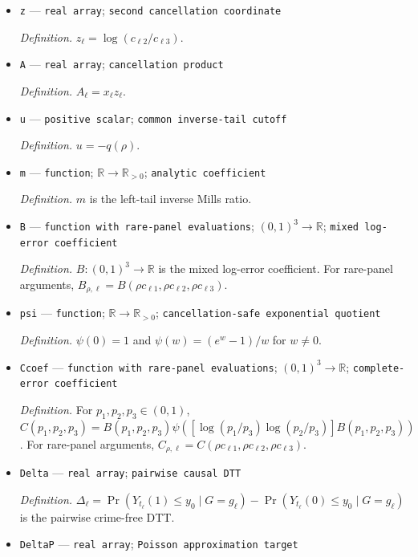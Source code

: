 \documentclass{article}
\begin{document}
\begin{itemize}
  \item \texttt{z} --- \texttt{real array}; \texttt{second cancellation coordinate}
  \par\smallskip\noindent\emph{Definition.} \(z_{\ell}=\log(c_{\ell2}/c_{\ell3})\).
  \item \texttt{A} --- \texttt{real array}; \texttt{cancellation product}
  \par\smallskip\noindent\emph{Definition.} \(A_{\ell}=x_{\ell}z_{\ell}\).
  \item \texttt{u} --- \texttt{positive scalar}; \texttt{common inverse-\allowbreak{}tail cutoff}
  \par\smallskip\noindent\emph{Definition.} \(u=-q(\rho)\).
  \item \texttt{m} --- \texttt{function}; \(\mathbb R\to\mathbb R_{>0}\); \texttt{analytic coefficient}
  \par\smallskip\noindent\emph{Definition.} \(m\) is the left-tail inverse Mills ratio.
  \item \texttt{B} --- \texttt{function with rare-\allowbreak{}panel evaluations}; \((0,1)^3\to\mathbb R\); \texttt{mixed log-\allowbreak{}error coefficient}
  \par\smallskip\noindent\emph{Definition.} \(B:(0,1)^3\to\mathbb R\) is the mixed log-error coefficient. For rare-panel arguments, \(B_{\rho,\ell}=B(\rho c_{\ell1},\rho c_{\ell2},\rho c_{\ell3})\).
  \item \texttt{psi} --- \texttt{function}; \(\mathbb R\to\mathbb R_{>0}\); \texttt{cancellation-\allowbreak{}safe exponential quotient}
  \par\smallskip\noindent\emph{Definition.} \(\psi(0)=1\) and \(\psi(w)=(e^w-1)/w\) for \(w\ne0\).
  \item \texttt{Ccoef} --- \texttt{function with rare-\allowbreak{}panel evaluations}; \((0,1)^3\to\mathbb R\); \texttt{complete-\allowbreak{}error coefficient}
  \par\smallskip\noindent\emph{Definition.} For \(p_1,p_2,p_3\in(0,1)\), \(C(p_1,p_2,p_3)=B(p_1,p_2,p_3)\psi\!\left(\left[\log(p_1/p_3)\log(p_2/p_3)\right]B(p_1,p_2,p_3)\right)\). For rare-panel arguments, \(C_{\rho,\ell}=C(\rho c_{\ell1},\rho c_{\ell2},\rho c_{\ell3})\).
  \item \texttt{Delta} --- \texttt{real array}; \texttt{pairwise causal DTT}
  \par\smallskip\noindent\emph{Definition.} \(\Delta_{\ell}=\Pr(Y_{t_{\ell}}(1)\le y_0\mid G=g_{\ell})-\Pr(Y_{t_{\ell}}(0)\le y_0\mid G=g_{\ell})\) is the pairwise crime-free DTT.
  \item \texttt{DeltaP} --- \texttt{real array}; \texttt{Poisson approximation target}

\end{itemize}
\end{document}
